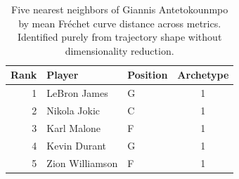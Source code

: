 \begin{table}[htbp]
  \centering\small
  \begin{tabular}{rllc}
    \toprule
    Rank & Player & Position & Archetype \\
    \midrule
    1 & LeBron James & G & 1 \\
    2 & Nikola Jokic & C & 1 \\
    3 & Karl Malone & F & 1 \\
    4 & Kevin Durant & G & 1 \\
    5 & Zion Williamson & F & 1 \\
    \bottomrule
  \end{tabular}
  \caption{Five nearest neighbors of Giannis Antetokounmpo by mean Fr\'{e}chet curve distance across metrics. Identified purely from trajectory shape without dimensionality reduction.}
  \label{tab:Giannis_Antetokounmpo_frechet_curve_neighbors}
\end{table}

